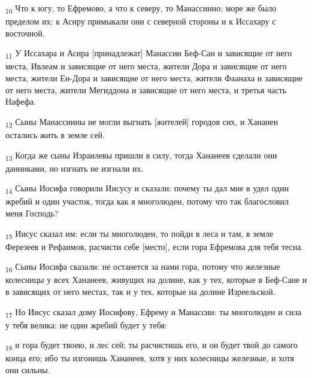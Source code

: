 \begin{tcolorbox}
\textsubscript{10} Что к югу, то Ефремово, а что к северу, то Манассиино; море же было пределом их; к Асиру примыкали они с северной стороны и к Иссахару с восточной.
\end{tcolorbox}
\begin{tcolorbox}
\textsubscript{11} У Иссахара и Асира [принадлежат] Манассии Беф-Сан и зависящие от него места, Ивлеам и зависящие от него места, жители Дора и зависящие от него места, жители Ен-Дора и зависящие от него места, жители Фаанаха и зависящие от него места, жители Мегиддона и зависящие от него места, и третья часть Нафефа.
\end{tcolorbox}
\begin{tcolorbox}
\textsubscript{12} Сыны Манассиины не могли выгнать [жителей] городов сих, и Хананеи остались жить в земле сей.
\end{tcolorbox}
\begin{tcolorbox}
\textsubscript{13} Когда же сыны Израилевы пришли в силу, тогда Хананеев сделали они данниками, но изгнать не изгнали их.
\end{tcolorbox}
\begin{tcolorbox}
\textsubscript{14} Сыны Иосифа говорили Иисусу и сказали: почему ты дал мне в удел один жребий и один участок, тогда как я многолюден, потому что так благословил меня Господь?
\end{tcolorbox}
\begin{tcolorbox}
\textsubscript{15} Иисус сказал им: если ты многолюден, то пойди в леса и там, в земле Ферезеев и Рефаимов, расчисти себе [место], если гора Ефремова для тебя тесна.
\end{tcolorbox}
\begin{tcolorbox}
\textsubscript{16} Сыны Иосифа сказали: не останется за нами гора, потому что железные колесницы у всех Хананеев, живущих на долине, как у тех, которые в Беф-Сане и в зависящих от него местах, так и у тех, которые на долине Изреельской.
\end{tcolorbox}
\begin{tcolorbox}
\textsubscript{17} Но Иисус сказал дому Иосифову, Ефрему и Манассии: ты многолюден и сила у тебя велика; не один жребий будет у тебя:
\end{tcolorbox}
\begin{tcolorbox}
\textsubscript{18} и гора будет твоею, и лес сей; ты расчистишь его, и он будет твой до самого конца его; ибо ты изгонишь Хананеев, хотя у них колесницы железные, и хотя они сильны.
\end{tcolorbox}

